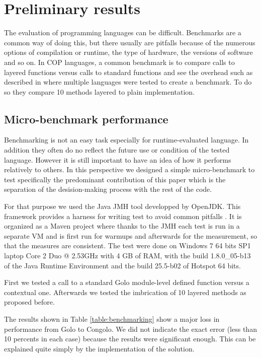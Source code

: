 \documentclass{sig-alternate}
\begin{document}
 
\section{Preliminary results}
\label{results}

The evaluation of programming languages can be difficult. Benchmarks are a common way of doing this, but there usually are pitfalls because of the numerous options of compilation or runtime, the type of hardware, the versions of software and so on. In COP languages, a common benchmark is to compare calls to layered functions versus calls to standard functions and see the overhead such as described in \cite{appeltauer_comparison_2009} where multiple languages were tested to create a benchmark. To do so they compare 10 methods layered to plain implementation. 

\subsection{Micro-benchmark performance}
Benchmarking is not an easy task especially for runtime-evaluated language. In addition they often do no reflect the future use or condition of the tested language. However it is still important to have an idea of how it performs relatively to others. In this perspective we designed a simple micro-benchmark to test specifically the predominant contribution of this paper which is the separation of the desision-making process with the rest of the code.

For that purpose we used the Java JMH tool developped by OpenJDK. This framework provides a harness for writing test to avoid common pitfalls \cite{jponge_benchmarking_2014}. It is organized as a Maven project where thanks to the JMH each test is run in a separate VM and is first run for warmups and afterwards for the measurement, so that the measures are consistent. The test were done on Windows 7 64 bits SP1 laptop Core 2 Duo @ 2.53GHz with 4 GB of RAM, with the build 1.8.0\_05-b13 of the Java Runtime Environment and the build 25.5-b02 of Hotspot 64 bits.

First we tested a call to a standard Golo module-level defined function versus a contextual one. Afterwards we tested the imbrication of 10 layered methods as proposed before.

The results shown in Table \ref{table:benchmarking} show a major loss in performance from Golo to Congolo. We did not indicate the exact error (less than 10 percents in each case) because the results were significant enough. This can be explained quite simply by the implementation of the solution. 
\end{document}
